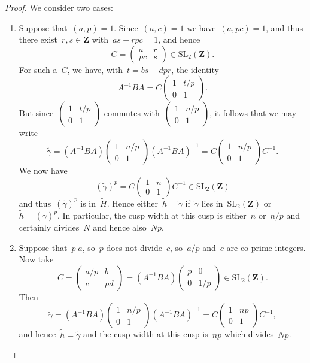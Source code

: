 \documentclass[10pt]{amsart}
\def\wh{\widetilde{h}}
\def\wH{\widetilde{H}}
\def\wgamma{\widetilde{\gamma}}
\def\Z{\mathbf{Z}}
\theoremstyle{remark}
\numberwithin{equation}{subsection}
\def\SL{\mathrm{SL}}
\begin{document}
\begin{proof}
We consider two cases:
\begin{enumerate}
\item
Suppose that~$(a,p) = 1$. 
Since~$(a,c) = 1$ we have~$(a,pc) = 1$, and thus there exist~$r,s \in \Z$ 
with~$a s - r p c = 1$, and hence 
$$C = \left( \begin{matrix} a & r \\ pc & s \end{matrix} \right) \in \SL_2(\Z).$$
For such a~$C$, we have, with~$t = b s - d p r$, the identity
$$A^{-1} B A = C  \left( \begin{matrix} 1 & t/p \\ 0 & 1 \end{matrix} \right).$$
But since~$\left( \begin{matrix} 1  & t/p \\ 0 & 1 \end{matrix} \right)$ commutes with~$\left( \begin{matrix} 1  & n/p \\ 0 & 1 \end{matrix} \right)$,
it follows that we may write
$$ \wgamma =
(A^{-1} B A)  \left( \begin{matrix} 1 & n/p \\ 0 & 1 \end{matrix} \right)  (A^{-1} B A)^{-1} 
= C  \left( \begin{matrix} 1 & n/p \\ 0 & 1 \end{matrix} \right)  C^{-1}.$$
We now have
$$(\wgamma)^p = C  \left( \begin{matrix} 1 & n \\ 0 & 1 \end{matrix} \right)   C^{-1} \in \SL_2(\Z)$$
 and thus~$(\wgamma)^p$ is in~$\wH$.
 Hence either~$\wh = \wgamma$ if~$\wgamma$ lies in~$\SL_2(\Z)$ or~$\wh =  (\wgamma)^p$.
 In  particular, the cusp width at this cusp is either~$n$ or~$n/p$ and certainly divides~$N$ and hence also~$Np$.
\item Suppose that~$p | a$, so~$p$ does not divide~$c$, so~$a/p$ and~$c$ are  co-prime integers.
 Now take
$$ C = \left( \begin{matrix} a/p & b \\ c & pd \end{matrix} \right)=(A^{-1}BA)\left( \begin{matrix} p & 0 \\ 0 & 1/p \end{matrix} \right) \in \SL_2(\Z).$$
Then
$$  \wgamma = 
(A^{-1} B A)  \left( \begin{matrix} 1 & n/p \\ 0 & 1 \end{matrix} \right)  (A^{-1} B A)^{-1} 
= C  \left( \begin{matrix} 1 & np \\ 0 & 1 \end{matrix} \right)  C^{-1},$$
and hence~$\wh = \wgamma$ and the cusp width at this cusp is~$np$ which divides~$Np$. \qedhere
\end{enumerate}
\end{proof}
\end{document}
